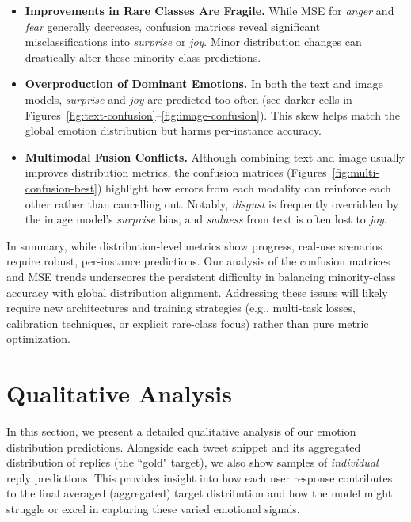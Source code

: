 \begin{itemize}
    \item \textbf{Improvements in Rare Classes Are Fragile.} While MSE for \emph{anger} and \emph{fear} generally decreases, confusion matrices reveal significant misclassifications into \emph{surprise} or \emph{joy}. Minor distribution changes can drastically alter these minority-class predictions.
    
    \item \textbf{Overproduction of Dominant Emotions.} In both the text and image models, \emph{surprise} and \emph{joy} are predicted too often (see darker cells in Figures~\ref{fig:text-confusion}--\ref{fig:image-confusion}). This skew helps match the global emotion distribution but harms per-instance accuracy.
    
    \item \textbf{Multimodal Fusion Conflicts.} Although combining text and image usually improves distribution metrics, the confusion matrices (Figures~\ref{fig:multi-confusion-best}) highlight how errors from each modality can reinforce each other rather than cancelling out. Notably, \emph{disgust} is frequently overridden by the image model’s \emph{surprise} bias, and \emph{sadness} from text is often lost to \emph{joy}.
\end{itemize}

In summary, while distribution-level metrics show progress, real-use scenarios require robust, per-instance predictions. Our analysis of the confusion matrices and MSE trends underscores the persistent difficulty in balancing minority-class accuracy with global distribution alignment. Addressing these issues will likely require new architectures and training strategies (e.g., multi-task losses, calibration techniques, or explicit rare-class focus) rather than pure metric optimization.





\section{Qualitative Analysis}

In this section, we present a detailed qualitative analysis of our emotion distribution predictions. Alongside each tweet snippet and its aggregated distribution of replies (the ``gold" target), we also show samples of \emph{individual} reply predictions. This provides insight into how each user response contributes to the final averaged (aggregated) target distribution and how the model might struggle or excel in capturing these varied emotional signals.

